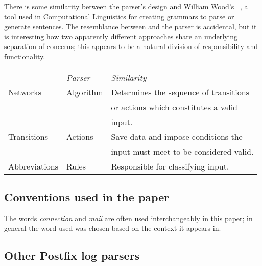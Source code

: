 \documentclass[a4paper,12pt,draft]{article}
\begin{document}
There is some similarity between the parser's design and William Wood's
\ATN{}~\cite{atns, nlpip}, a tool used in Computational Linguistics for
creating grammars to parse or generate sentences.  The resemblance between
\ATN{} and the parser is accidental, but it is interesting how two
apparently different approaches share an underlying separation of concerns;
this appears to be a natural division of responsibility and functionality.


\begin{tabular}[]{lll}
    \textit{\ATN{}\/}   & \textit{Parser\/} & \textit{Similarity\/}     \\
    Networks            & Algorithm         & Determines the sequence 
                                              of transitions            \\
                        &                   & or actions which 
                                              constitutes a valid       \\
                        &                   & input.                    \\
    Transitions         & Actions           & Save data and impose
                                              conditions the            \\
                        &                   & input must meet to be
                                              considered valid.         \\
    Abbreviations       & Rules             & Responsible for 
                                              classifying input.        \\
\end{tabular}

\subsection{Conventions used in the paper}

The words \textit{connection\/} and \textit{mail\/} are often used
interchangeably in this paper; in general the word used was chosen based on
the context it appears in.

\subsection{Other Postfix log parsers}
\end{document}
